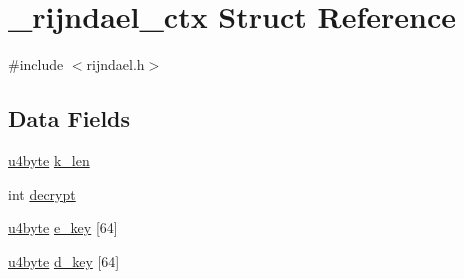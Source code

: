 \hypertarget{struct__rijndael__ctx}{\section{\-\_\-rijndael\-\_\-ctx Struct Reference}
\label{struct__rijndael__ctx}
}


{\ttfamily \#include $<$rijndael.\-h$>$}

\subsection*{Data Fields}
\begin{DoxyCompactItemize}
\item 
\hyperlink{rijndael_8h_addeada50f7444917aba8721479216fe2}{u4byte} \hyperlink{struct__rijndael__ctx_ac3595b891818be236ee4cbf50995b8af}{k\-\_\-len}
\item 
int \hyperlink{struct__rijndael__ctx_aa07afd8353126ce5e938b42ceaff42b7}{decrypt}
\item 
\hyperlink{rijndael_8h_addeada50f7444917aba8721479216fe2}{u4byte} \hyperlink{struct__rijndael__ctx_abc54a82997fe467b97400f22d9b4d7dc}{e\-\_\-key} \mbox{[}64\mbox{]}
\item 
\hyperlink{rijndael_8h_addeada50f7444917aba8721479216fe2}{u4byte} \hyperlink{struct__rijndael__ctx_a45e6be46127c0bb68886cd4c0c725dc6}{d\-\_\-key} \mbox{[}64\mbox{]}
\end{DoxyCompactItemize}


